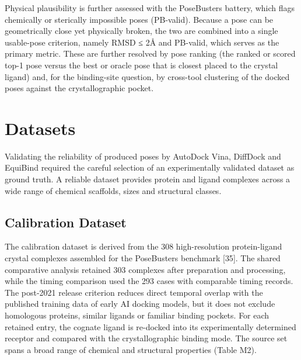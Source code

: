 Physical plausibility is further assessed with the PoseBusters battery, which flags chemically or sterically impossible poses (PB-valid). Because a pose can be geometrically close yet physically broken, the two are combined into a single usable-pose criterion, namely RMSD ≤ 2Å and PB-valid, which serves as the primary metric. These are further resolved by pose ranking (the ranked or scored top-1 pose versus the best or oracle pose that is closest placed to the crystal ligand) and, for the binding-site question, by cross-tool clustering of the docked poses against the crystallographic pocket.

\hypertarget{datasets}{%
\section{Datasets}\label{datasets}}

Validating the reliability of produced poses by AutoDock Vina, DiffDock and EquiBind required the careful selection of an experimentally validated dataset as ground truth. A reliable dataset provides protein and ligand complexes across a wide range of chemical scaffolds, sizes and structural classes.

\protect\hypertarget{_Toc235735885}{}{}

\hypertarget{calibration-dataset}{%
\subsection{Calibration Dataset}\label{calibration-dataset}}

The calibration dataset is derived from the 308 high-resolution protein-ligand crystal complexes assembled for the PoseBusters benchmark {[}35{]}. The shared comparative analysis retained 303 complexes after preparation and processing, while the timing comparison used the 293 cases with comparable timing records. The post-2021 release criterion reduces direct temporal overlap with the published training data of early AI docking models, but it does not exclude homologous proteins, similar ligands or familiar binding pockets. For each retained entry, the cognate ligand is re-docked into its experimentally determined receptor and compared with the crystallographic binding mode. The source set spans a broad range of chemical and structural properties (Table M2).

